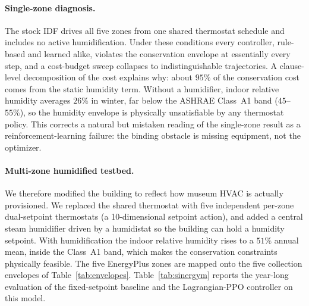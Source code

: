 \documentclass[11pt,a4paper]{article}
\begin{document}
\paragraph{Single-zone diagnosis.}
The stock IDF drives all five zones from one shared thermostat schedule
and includes no active humidification. Under these conditions every
controller, rule-based and learned alike, violates the conservation
envelope at essentially every step, and a cost-budget sweep collapses
to indistinguishable trajectories. A clause-level decomposition of the
cost explains why: about $95\%$ of the conservation cost comes from the
static humidity term. Without a humidifier, indoor relative humidity
averages $26\%$ in winter, far below the ASHRAE Class~A1 band
($45$--$55\%$), so the humidity envelope is physically unsatisfiable by
any thermostat policy. This corrects a natural but mistaken reading of
the single-zone result as a reinforcement-learning failure: the
binding obstacle is missing equipment, not the optimizer.

\paragraph{Multi-zone humidified testbed.}
We therefore modified the building to reflect how museum HVAC is
actually provisioned. We replaced the shared thermostat with five
independent per-zone dual-setpoint thermostats (a 10-dimensional
setpoint action), and added a central steam humidifier driven by a
humidistat so the building can hold a humidity setpoint. With
humidification the indoor relative humidity rises to a $51\%$ annual
mean, inside the Class~A1 band, which makes the conservation
constraints physically feasible. The five EnergyPlus zones are mapped
onto the five collection envelopes of Table~\ref{tab:envelopes}.
Table~\ref{tab:sinergym} reports the year-long evaluation of the
fixed-setpoint baseline and the Lagrangian-PPO controller on this
model.
\end{document}
